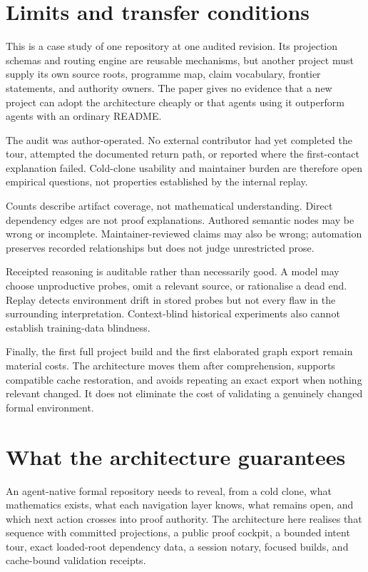\documentclass[11pt]{article}
\begin{document}
\section{Limits and transfer conditions}\label{sec:limits}

This is a case study of one repository at one audited revision. Its projection
schemas and routing engine are reusable mechanisms, but another project must
supply its own source roots, programme map, claim vocabulary, frontier
statements, and authority owners. The paper gives no evidence that a new
project can adopt the architecture cheaply or that agents using it outperform
agents with an ordinary README.

The audit was author-operated. No external contributor had yet completed the
tour, attempted the documented return path, or reported where the first-contact
explanation failed. Cold-clone usability and maintainer burden are therefore
open empirical questions, not properties established by the internal replay.

Counts describe artifact coverage, not mathematical understanding. Direct
dependency edges are not proof explanations. Authored semantic nodes may be
wrong or incomplete. Maintainer-reviewed claims may also be wrong; automation
preserves recorded relationships but does not judge unrestricted prose.

Receipted reasoning is auditable rather than necessarily good. A model may
choose unproductive probes, omit a relevant source, or rationalise a dead end.
Replay detects environment drift in stored probes but not every flaw in the
surrounding interpretation. Context-blind historical experiments also cannot
establish training-data blindness.

Finally, the first full project build and the first elaborated graph export
remain material costs. The architecture moves them after comprehension,
supports compatible cache restoration, and avoids repeating an exact export
when nothing relevant changed. It does not eliminate the cost of validating a
genuinely changed formal environment.

\section{What the architecture guarantees}\label{sec:conclusion}

An agent-native formal repository needs to reveal, from a cold clone, what
mathematics exists, what each navigation
layer knows, what remains open, and which next action crosses into proof
authority. The architecture here realises that sequence with committed
projections, a public proof cockpit, a bounded intent tour, exact loaded-root
dependency data, a session notary, focused builds, and cache-bound validation
receipts.
\end{document}
